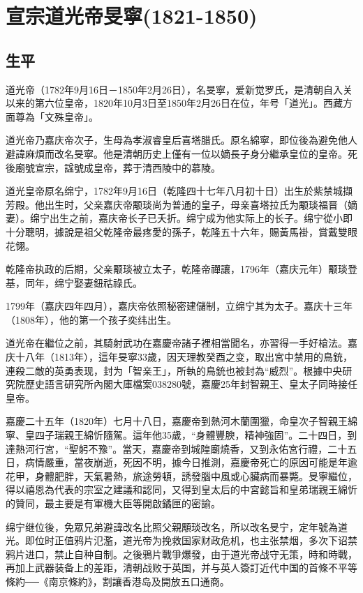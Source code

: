 
\section{宣宗道光帝旻寧\tiny(1821-1850)}

\subsection{生平}

道光帝（1782年9月16日－1850年2月26日），名旻寧，爱新觉罗氏，是清朝自入关以来的第六位皇帝，1820年10月3日至1850年2月26日在位，年号「道光」。西藏方面尊為「文殊皇帝」。

道光帝乃嘉庆帝次子，生母為孝淑睿皇后喜塔腊氏。原名綿寧，即位後為避免他人避諱麻煩而改名旻寧。他是清朝历史上僅有一位以嫡長子身分繼承皇位的皇帝。死後廟號宣宗，諡號成皇帝，葬于清西陵中的慕陵。

道光皇帝原名绵宁，1782年9月16日（乾隆四十七年八月初十日）出生於紫禁城擷芳殿。他出生时，父亲嘉庆帝颙琰尚为普通的皇子，母亲喜塔拉氏为颙琰福晋（嫡妻）。绵宁出生之前，嘉庆帝长子已夭折。绵宁成为他实际上的长子。绵宁從小即十分聰明，據說是祖父乾隆帝最疼愛的孫子，乾隆五十六年，賜黃馬褂，賞戴雙眼花翎。

乾隆帝执政的后期，父亲颙琰被立太子，乾隆帝禪讓，1796年（嘉庆元年）颙琰登基，同年，绵宁娶妻鈕祜祿氏。

1799年（嘉庆四年四月），嘉庆帝依照秘密建儲制，立绵宁其为太子。嘉庆十三年（1808年），他的第一个孩子奕纬出生。

道光帝在繼位之前，其騎射武功在嘉慶帝諸子裡相當聞名，亦習得一手好槍法。嘉庆十八年（1813年），這年旻寧33歲，因天理教癸酉之变，取出宮中禁用的鳥銃，連殺二敵的英勇表现，封为「智亲王」，所執的鳥銃也被封為“威烈”。根據中央研究院歷史語言研究所內閣大庫檔案038280號，嘉慶25年封智親王、皇太子同時接任皇帝。

嘉慶二十五年（1820年）七月十八日，嘉慶帝到熱河木蘭圍獵，命皇次子智親王綿寧、皇四子瑞親王綿忻隨駕。這年他35歲，“身體豐腴，精神強固”。二十四日，到達熱河行宮，“聖躬不豫”。當天，嘉慶帝到城隍廟燒香，又到永佑宮行禮，二十五日，病情嚴重，當夜崩逝，死因不明，據今日推測，嘉慶帝死亡的原因可能是年逾花甲，身體肥胖，天氣暑熱，旅途勞頓，誘發腦中風或心臟病而暴斃。旻寧繼位，得以禧恩為代表的宗室之建議和認同，又得到皇太后的中宮懿旨和皇弟瑞親王綿忻的贊同，最主要是有軍機大臣等開啟鐍匣的密諭。

绵宁继位後，免眾兄弟避諱改名比照父親顒琰改名，所以改名旻宁，定年號為道光。即位时正值鸦片氾濫，道光帝为挽救国家财政危机，也主张禁烟，多次下诏禁鸦片进口，禁止自种自制。之後鴉片戰爭爆發，由于道光帝战守无策，時和時戰，再加上武器装备上的差距，清朝战败于英国，并与英人簽訂近代中国的首條不平等條約──《南京條約》，割讓香港岛及開放五口通商。

